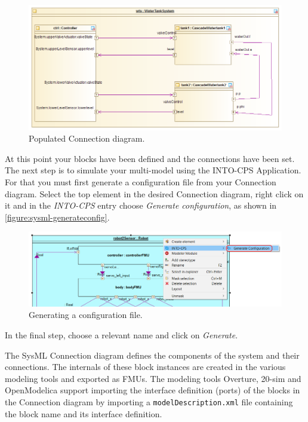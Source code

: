\begin{figure}[hpt!]
\centering
\includegraphics[width=\textwidth]{./figures/sysml-connection-final.png}
\caption{Populated Connection diagram.}
\label{figure:sysml-connection-final}
\end{figure}
%
%
%
At this point your blocks have been defined and the connections have been set.
%
The next step is to simulate your multi-model using the INTO-CPS Application.
%
For that you must first generate a configuration file from your Connection diagram.
%
Select the top element in the desired Connection diagram, right click on it and in the \emph{INTO-CPS} entry choose \emph{Generate configuration}, as shown in \autoref{figure:sysml-generateconfig}.
%
%
%
\begin{figure}[hpt!]
\centering
\includegraphics[width=\textwidth]{./figures/sysml-generateconfig.png}
\caption{Generating a configuration file.}
\label{figure:sysml-generateconfig}
\end{figure}
%
%
%
In the final step, choose a relevant name and click on \textit{Generate}.

The SysML Connection diagram defines the components of the system and their connections.
The internals of these block instances are created in the various modeling tools and exported as FMUs.
The modeling tools Overture, {20-sim} and OpenModelica support importing the interface definition (ports) of the blocks in the Connection diagram by importing a \texttt{modelDescription.xml} file containing the block name and its interface definition.

